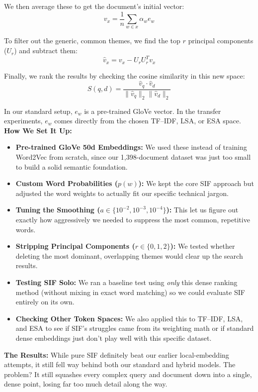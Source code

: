 \documentclass[runningheads]{llncs}
\begin{document}
We then average these to get the document's initial vector:
\begin{equation}
v_x = \frac{1}{n}\sum_{w \in x} \alpha_w e_w
\end{equation}

To filter out the generic, common themes, we find the top $r$ principal components ($U_r$) and subtract them:
\begin{equation}
\hat{v}_x = v_x - U_r U_r^T v_x
\end{equation}

Finally, we rank the results by checking the cosine similarity in this new space:
\begin{equation}
S(q,d) = \frac{\hat{v}_q \cdot \hat{v}_d}{\|\hat{v}_q\|_2 \|\hat{v}_d\|_2}
\end{equation}

In our standard setup, $e_w$ is a pre-trained GloVe vector. In the transfer experiments, $e_w$ comes directly from the chosen TF--IDF, LSA, or ESA space.
\textbf{How We Set It Up:}
\begin{itemize}
    \item \textbf{Pre-trained GloVe 50d Embeddings:} We used these instead of training Word2Vec from scratch, since our 1,398-document dataset was just too small to build a solid semantic foundation.
    \item \textbf{Custom Word Probabilities ($p(w)$):} We kept the core SIF approach but adjusted the word weights to actually fit our specific technical jargon.
    \item \textbf{Tuning the Smoothing ($a \in \{10^{-2},10^{-3},10^{-4}\}$):} This let us figure out exactly how aggressively we needed to suppress the most common, repetitive words.
    \item \textbf{Stripping Principal Components ($r \in \{0,1,2\}$):} We tested whether deleting the most dominant, overlapping themes would clear up the search results.
    \item \textbf{Testing SIF Solo:} We ran a baseline test using \textit{only} this dense ranking method (without mixing in exact word matching) so we could evaluate SIF entirely on its own.
    \item \textbf{Checking Other Token Spaces:} We also applied this to TF--IDF, LSA, and ESA to see if SIF's struggles came from its weighting math or if standard dense embeddings just don't play well with this specific dataset.
\end{itemize}

\textbf{The Results:}
While pure SIF definitely beat our earlier local-embedding attempts, it still fell way behind both our standard and hybrid models. The problem? It still squashes every complex query and document down into a single, dense point, losing far too much detail along the way.
\end{document}
